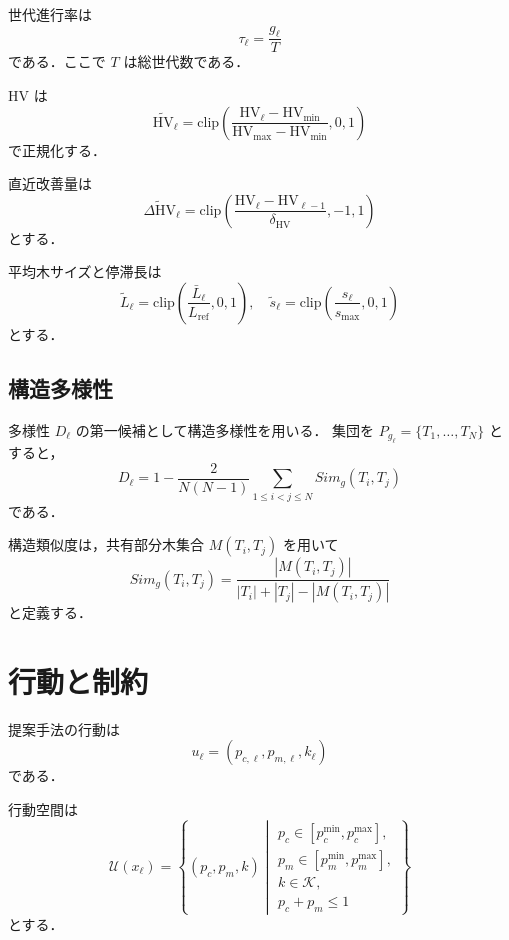 \documentclass[a4paper,11pt]{ltjsarticle}
\newcommand{\clip}{\mathrm{clip}}
\newcommand{\HV}{\mathrm{HV}}
\begin{document}
世代進行率は
\begin{equation}
\tau_\ell=\frac{g_\ell}{T}
\end{equation}
である．ここで \(T\) は総世代数である．

HV は
\begin{equation}
\widetilde{\HV}_\ell
=
\clip
\left(
\frac{\HV_\ell-\HV_{\min}}{\HV_{\max}-\HV_{\min}},
0,1
\right)
\end{equation}
で正規化する．

直近改善量は
\begin{equation}
\widetilde{\Delta \HV}_\ell
=
\clip
\left(
\frac{\HV_\ell-\HV_{\ell-1}}{\delta_{\HV}},
-1,1
\right)
\end{equation}
とする．

平均木サイズと停滞長は
\begin{equation}
\widetilde{L}_\ell
=
\clip
\left(
\frac{\bar{L}_\ell}{L_{\mathrm{ref}}},
0,1
\right),
\quad
\widetilde{s}_\ell
=
\clip
\left(
\frac{s_\ell}{s_{\max}},
0,1
\right)
\end{equation}
とする．

\subsection{構造多様性}

多様性 \(D_\ell\) の第一候補として構造多様性を用いる．
集団を \(P_{g_\ell}=\{T_1,\dots,T_N\}\) とすると，
\begin{equation}
D_\ell
=
1
-
\frac{2}{N(N-1)}
\sum_{1\le i<j\le N}
Sim_g(T_i,T_j)
\end{equation}
である．

構造類似度は，共有部分木集合 \(M(T_i,T_j)\) を用いて
\begin{equation}
Sim_g(T_i,T_j)
=
\frac{|M(T_i,T_j)|}
{|T_i|+|T_j|-|M(T_i,T_j)|}
\end{equation}
と定義する．

\section{行動と制約}

提案手法の行動は
\begin{equation}
u_\ell=(p_{c,\ell},p_{m,\ell},k_\ell)
\end{equation}
である．

行動空間は
\begin{equation}
\mathcal{U}(x_\ell)
=
\left\{
(p_c,p_m,k)
\middle|
\begin{array}{l}
p_c\in[p_c^{\min},p_c^{\max}],\\
p_m\in[p_m^{\min},p_m^{\max}],\\
k\in\mathcal{K},\\
p_c+p_m\le 1
\end{array}
\right\}
\end{equation}
とする．
\end{document}
